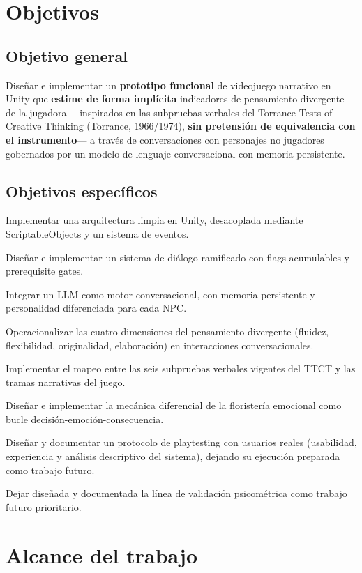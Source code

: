 \documentclass[12pt,twoside,titlepage]{report}
\begin{document}
\section{Objetivos}

\subsection{Objetivo general}

Diseñar e implementar un \textbf{prototipo funcional} de videojuego narrativo en Unity que \textbf{estime de forma implícita} indicadores de pensamiento divergente de la jugadora ---inspirados en las subpruebas verbales del Torrance Tests of Creative Thinking (Torrance, 1966/1974), \textbf{sin pretensión de equivalencia con el instrumento}--- a través de conversaciones con personajes no jugadores gobernados por un modelo de lenguaje conversacional con memoria persistente.

\subsection{Objetivos específicos}

Implementar una arquitectura limpia en Unity, desacoplada mediante ScriptableObjects y un sistema de eventos.

Diseñar e implementar un sistema de diálogo ramificado con flags acumulables y prerequisite gates.

Integrar un LLM como motor conversacional, con memoria persistente y personalidad diferenciada para cada NPC.

Operacionalizar las cuatro dimensiones del pensamiento divergente (fluidez, flexibilidad, originalidad, elaboración) en interacciones conversacionales.

Implementar el mapeo entre las seis subpruebas verbales vigentes del TTCT y las tramas narrativas del juego.

Diseñar e implementar la mecánica diferencial de la floristería emocional como bucle decisión-emoción-consecuencia.

Diseñar y documentar un protocolo de playtesting con usuarios reales (usabilidad, experiencia y análisis descriptivo del sistema), dejando su ejecución preparada como trabajo futuro.

Dejar diseñada y documentada la línea de validación psicométrica como trabajo futuro prioritario.

\section{Alcance del trabajo}
\end{document}
